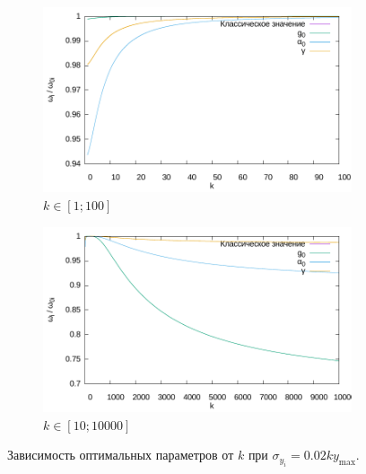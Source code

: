 \documentclass[11pt,a4paper]{article}
\begin{document}
\begin{figure}[h]
  \centering
  \begin{subfigure}[b]{0.5\textwidth}
    \includegraphics[width=\textwidth]{figs/levmar/convergence/fixedXY_0.1/convergence_100.txt.pdf}
	\caption{$k \in [1; 100]$}
	\label{fig:conv_fixedY_100}
  \end{subfigure}%
  \begin{subfigure}[b]{0.5\textwidth}
    \includegraphics[width=\textwidth]{figs/levmar/convergence/fixedXY_0.1/convergence_10000.txt.pdf}
	\caption{$k \in [10; 10000]$}
	\label{fig:conv_fixedY_10000}
  \end{subfigure}
  \caption{Зависимость оптимальных параметров от $k$ при $\sigma_{y_i} = 0.02ky_{\max}$.}
  \label{fig:conv_fixedY}
\end{figure}

\FloatBarrier


%
%

\end{document}
